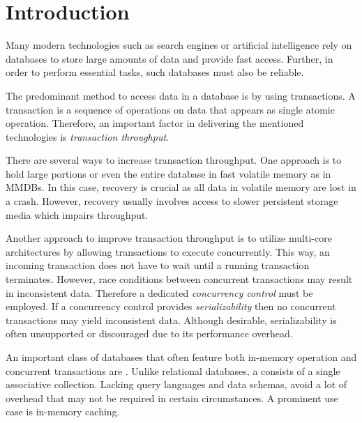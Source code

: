 \chapter{Introduction}
\label{ch:intro}



Many modern technologies such as search engines or artificial intelligence rely
on databases to store large amounts of data and provide fast access. Further, in
order to perform essential tasks, such databases must also be reliable.

The predominant method to access data in a database is by using transactions. A
transaction is a sequence of operations on data that appears as single atomic
operation. Therefore, an important factor in delivering the mentioned
technologies is \textit{transaction throughput}.

There are several ways to increase transaction throughput. One approach is to
hold large portions or even the entire database in fast volatile memory as in
\acp{MMDB}. In this case, recovery is crucial as all data in volatile memory are
lost in a crash. However, recovery usually involves access to slower persistent
storage media which impairs throughput.

Another approach to improve transaction throughput is to utilize multi-core
architectures by allowing transactions to execute concurrently. This way, an
incoming transaction does not have to wait until a running transaction
terminates. However, race conditions between concurrent transactions may result
in inconsistent data. Therefore a dedicated \textit{concurrency control} must be
employed. If a concurrency control provides \textit{serializability} then no
concurrent transactions may yield inconsistent data. Although desirable,
serializability is often unsupported or discouraged due to its performance
overhead.

An important class of databases that often feature both in-memory operation and
concurrent transactions are \textit{\kvsp}. Unlike relational databases, a \kvs
consists of a single associative collection. Lacking query languages and data
schemas, \kvsp avoid a lot of overhead that may not be required in certain
circumstances. A prominent use case is in-memory caching.


